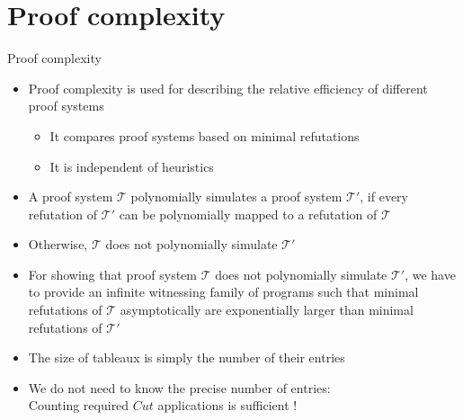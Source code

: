 \section{Proof complexity}
\begin{frame}{Proof complexity}
  \begin{itemize}
  \item<1-> \alert{Proof complexity} is used for describing the relative efficiency of different proof systems
    \begin{itemize}
    \item<2-> [] It compares proof systems based on \alert{minimal refutations}
    \item<2-> [] It is independent of heuristics
    \end{itemize}
  \item<3-> A proof system ${\mathcal{T}}$ \alert{polynomially simulates} a proof system ${\mathcal{T}}'$,
    if every refutation of ${\mathcal{T}}'$ can be polynomially mapped to a refutation of ${\mathcal{T}}$
  \item<3-> [] Otherwise, ${\mathcal{T}}$ does not polynomially simulate ${\mathcal{T}}'$
  \item<4-> For showing that proof system ${\mathcal{T}}$ does not polynomially simulate ${\mathcal{T}}'$,
    we have to provide an infinite \alert{witnessing family} of programs such that minimal
    refutations of ${\mathcal{T}}$ asymptotically are exponentially larger than minimal refutations of ${\mathcal{T}}'$
  \item<4-> [] The size of tableaux is simply the number of their entries
  \item<5-> We do not need to know the precise number of entries:\\
    \alert{Counting required $\textit{Cut}$ applications is sufficient !}
  \end{itemize}
\end{frame}
